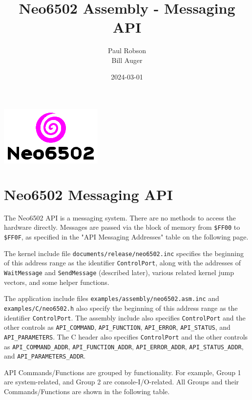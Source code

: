 \documentclass[12pt]{article}
\title{Neo6502 Assembly - Messaging API}
\author{Paul Robson \\ Bill Auger}
\date{2024-03-01}
\newcommand{\MonoSp}[1] {\fontsize{10pt}{10pt}\selectfont\texttt{#1}\normalsize}
\begin{document}
\maketitle

\begin{center}
  \includegraphics[scale=2.0]{neo6502-text-logo.png}
\end{center}

\tableofcontents


\pagebreak


\section{Neo6502 Messaging API}\label{api}

The Neo6502 API is a messaging system.
There are no methods to access the hardware directly.
Messages are passed via the block of memory from \MonoSp{\$FF00} to \MonoSp{\$FF0F},
as specified in the "API Messaging Addresses" table on the following page.
\newline

The kernel include file \MonoSp{documents/release/neo6502.inc}
specifies the beginning of this address range as the identifier \MonoSp{ControlPort},
along with the addresses of \MonoSp{WaitMessage} and \MonoSp{SendMessage} (described later),
various related kernel jump vectors, and some helper functions.
\newline

The application include files \MonoSp{examples/assembly/neo6502.asm.inc}
and \MonoSp{examples/C/neo6502.h}
also specify the beginning of this address range as the identifier \MonoSp{ControlPort}.
The assembly include also specifies \MonoSp{ControlPort} and the other controls as
\MonoSp{API\_COMMAND}, \MonoSp{API\_FUNCTION}, \MonoSp{API\_ERROR},
\MonoSp{API\_STATUS}, and \MonoSp{API\_PARAMETERS}.
The C header also specifies \MonoSp{ControlPort} and the other controls as
\MonoSp{API\_COMMAND\_ADDR}, \MonoSp{API\_FUNCTION\_ADDR},
\MonoSp{API\_ERROR\_ADDR}, \MonoSp{API\_STATUS\_ADDR},
and \MonoSp{API\_PARAMETERS\_ADDR}.
\newline

API Commands/Functions are grouped by functionality.
For example, Group 1 are system-related, and Group 2 are console-I/O-related.
All Groups and their Commands/Functions are shown in the following table.
\newline
\end{document}
